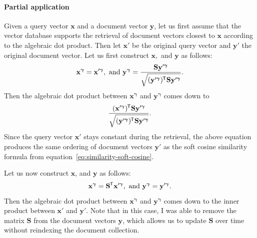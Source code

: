\documentclass[
  digital, %
  notable, %
  lof,     %
  lot,     %
  nopalatino, color
]{fithesis3}
\newcommand*{\tran}{^{\mkern-1.5mu\mathsf{T}}}
\begin{document}
\paragraph{Partial application} Given a query vector $\mathbf x$ and a
document vector $\mathbf y$, let us first assume that the vector database
supports the retrieval of document vectors closest to $\mathbf x$ according to
the algebraic dot product. Then let $\mathbf x'$ be the original query vector and
$\mathbf y'$ the original document vector. Let us first construct $\mathbf x,$
and $\mathbf y$ as follows:
\begin{equation*}
  \mathbf x^{\bm\gamma} = \mathbf x'^{\bm\gamma},\text{ and }
  \mathbf y^{\bm\gamma} = \frac{\mathbf S\mathbf y'^{\bm\gamma}}{\sqrt{\strut(\mathbf y'^{\bm\gamma})\tran\mathbf S\mathbf y'^{\bm\gamma}}}.
\end{equation*}
Then the algebraic dot product between $\mathbf x^{\bm\gamma}$ and $\mathbf
y^{\bm\gamma}$ comes down to
\begin{equation*}
  \frac{(\mathbf x'^{\bm\gamma})\tran\mathbf S\mathbf y'^{\bm\gamma}}{\sqrt{\strut(\mathbf y'^{\bm\gamma})\tran\mathbf S\mathbf y'^{\bm\gamma}}}.
\end{equation*}
Since the query vector $\mathbf x'$ stays constant during the retrieval, the above
equation produces the same ordering of document vectors $\mathbf y'$ as the soft
cosine similarity formula from equation~\ref{eq:similarity-soft-cosine}.

Let us now construct $\mathbf x$, and $\mathbf y$ as follows:
\begin{equation*}
  \mathbf x^{\bm\gamma} = \mathbf S\tran\mathbf x'^{\bm\gamma},\text{ and }
  \mathbf y^{\bm\gamma} = \mathbf y'^{\bm\gamma}.
\end{equation*}
Then the algebraic dot product between $\mathbf x^{\bm\gamma}$ and $\mathbf
y^{\bm\gamma}$ comes down to the inner product between $\mathbf x'$ and
$\mathbf y'$. Note that in this case, I was able to remove the matrix
$\mathbf S$ from the document vectors $\mathbf y$, which allows us to update
$\mathbf S$ over time without reindexing the document
collection.
\end{document}
